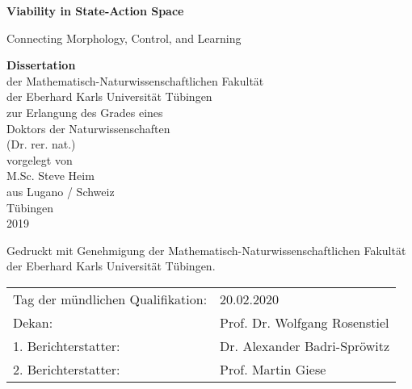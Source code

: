 \begin{titlepage}
   \begin{center}
    \vspace*{1cm}
    {\LARGE \textbf{Viability in State-Action Space\\}}

    \vspace{0.5cm}
    {\Large Connecting Morphology, Control, and Learning}

    \vspace{1.5cm}

    \textbf{Dissertation} \\
    {\large
    der Mathematisch-Naturwissenschaftlichen Fakultät \\
    der Eberhard Karls Universität Tübingen \\
    zur Erlangung des Grades eines \\
    Doktors der Naturwissenschaften \\
    (Dr. rer. nat.) \\
    \vspace{4cm}
    vorgelegt von \\
    M.Sc. Steve Heim \\
    aus Lugano / Schweiz \\
    \vspace{0.5cm}
    T\"{u}bingen \\
    2019}
    \end{center}
    \newpage
    \mbox{}
    \vfill
    \noindent
    Gedruckt mit Genehmigung der Mathematisch-Naturwissenschaftlichen Fakultät der Eberhard Karls Universität Tübingen. \\
    \vspace{2.5cm}
    \begin{table}[h!]
    \begin{tabular}{l l}
    Tag der mündlichen Qualifikation: & 20.02.2020 \\
    Dekan: & Prof. Dr. Wolfgang Rosenstiel \\
    1. Berichterstatter: & Dr. Alexander Badri-Spr\"{o}witz \\
    2. Berichterstatter: & Prof. Martin Giese \\
    \end{tabular}
    \end{table}






 
\end{titlepage}